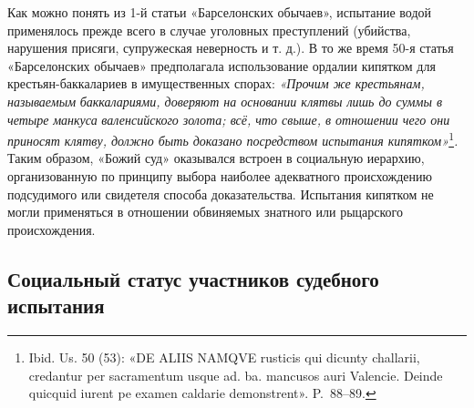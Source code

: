Как можно понять из 1-й статьи «Барселонских обычаев», испытание водой применялось прежде всего в случае уголовных преступлений (убийства, нарушения присяги, супружеская неверность и т. д.). В то же время 50-я статья «Барселонских обычаев» предполагала использование ордалии кипятком для крестьян-баккалариев в имущественных спорах: \emph{«Прочим же крестьянам, называемым }\emph{баккалариями}\emph{, доверяют на основании клятвы лишь до суммы в четыре }\emph{манкуса}\emph{ валенсийского золота; всё, что свыше, в отношении чего они приносят клятву, должно быть доказано посредством испытания кипятком»}\footnote{Ibid. Us. 50 (53): «DE ALIIS NAMQVE rusticis qui dicunty challarii, credantur per sacramentum usque ad. ba. mancusos auri Valencie. Deinde quicquid iurent pe examen caldarie demonstrent». P.~88--89.}\emph{. }Таким образом, «Божий суд» оказывался встроен в социальную иерархию, организованную по принципу выбора наиболее адекватного происхождению подсудимого или свидетеля способа доказательства. Испытания кипятком не могли применяться в отношении обвиняемых знатного или рыцарского происхождения.

\subsection{Социальный статус участников судебного испытания}

